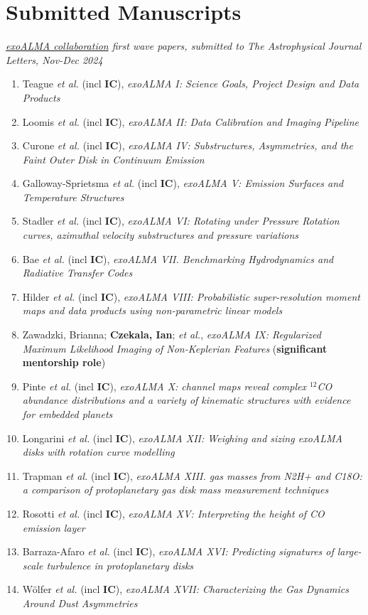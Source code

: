 \section*{Submitted Manuscripts}
\emph{\href{https://www.exoalma.com/}{exoALMA collaboration} first wave papers, submitted to The Astrophysical Journal Letters, Nov-Dec 2024}
\begin{enumerate}
\item Teague \emph{et al.} (incl \textbf{IC}), \emph{exoALMA I: Science Goals, Project Design and Data Products}
\item Loomis \emph{et al.} (incl \textbf{IC}), \emph{exoALMA II: Data Calibration and Imaging Pipeline}
\item Curone \emph{et al.} (incl \textbf{IC}), \emph{exoALMA IV: Substructures, Asymmetries, and the Faint Outer Disk in Continuum Emission}
\item Galloway-Sprietsma \emph{et al.} (incl \textbf{IC}), \emph{exoALMA V: Emission Surfaces and Temperature Structures}
\item Stadler \emph{et al.} (incl \textbf{IC}), \emph{exoALMA VI: Rotating under Pressure Rotation curves, azimuthal velocity substructures and pressure variations}
\item Bae \emph{et al.} (incl \textbf{IC}), \emph{exoALMA VII. Benchmarking Hydrodynamics and Radiative Transfer Codes}
\item Hilder \emph{et al.} (incl \textbf{IC}), \emph{exoALMA VIII: Probabilistic super-resolution moment maps and data products using non-parametric linear models}
\item Zawadzki, Brianna; \textbf{Czekala, Ian}; \emph{et al.}, \emph{exoALMA IX: Regularized Maximum Likelihood Imaging of Non-Keplerian Features} (\textbf{significant mentorship role})
\item Pinte \emph{et al.} (incl \textbf{IC}), \emph{exoALMA X: channel maps reveal complex $^{12}$CO abundance distributions and a variety of kinematic structures with evidence for embedded planets}
\item Longarini \emph{et al.} (incl \textbf{IC}), \emph{exoALMA XII: Weighing and sizing exoALMA disks with rotation curve modelling}
\item Trapman \emph{et al.} (incl \textbf{IC}), \emph{exoALMA XIII. gas masses from N2H+ and C18O: a comparison of protoplanetary gas disk mass measurement techniques}
\item Rosotti \emph{et al.} (incl \textbf{IC}), \emph{exoALMA XV: Interpreting the height of CO emission layer}
\item Barraza-Afaro \emph{et al.} (incl \textbf{IC}), \emph{exoALMA XVI: Predicting signatures of large-scale turbulence in protoplanetary disks} 
\item W\"{o}lfer \emph{et al.} (incl \textbf{IC}), \emph{exoALMA XVII: Characterizing the Gas Dynamics Around Dust Asymmetries}
\end{enumerate}
